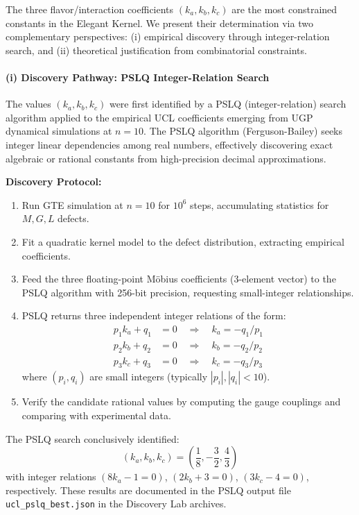 \documentclass[11pt,twocolumn]{article}
\begin{document}
The three flavor/interaction coefficients $(k_a, k_b, k_c)$ are the most constrained constants in the Elegant Kernel. We present their determination via two complementary perspectives: (i) empirical discovery through integer-relation search, and (ii) theoretical justification from combinatorial constraints.

\paragraph{(i) Discovery Pathway: PSLQ Integer-Relation Search}

The values $(k_a, k_b, k_c)$ were first identified by a PSLQ (integer-relation) search algorithm applied to the empirical UCL coefficients emerging from UGP dynamical simulations at $n=10$. The PSLQ algorithm (Ferguson-Bailey) seeks integer linear dependencies among real numbers, effectively discovering exact algebraic or rational constants from high-precision decimal approximations.

\textbf{Discovery Protocol:}
\begin{enumerate}[label=\arabic*., itemsep=0.15em]
\item Run GTE simulation at $n=10$ for $10^6$ steps, accumulating statistics for $M, G, L$ defects.
\item Fit a quadratic kernel model to the defect distribution, extracting empirical coefficients.
\item Feed the three floating-point Möbius coefficients (3-element vector) to the PSLQ algorithm with 256-bit precision, requesting small-integer relationships.
\item PSLQ returns three independent integer relations of the form:
\[
\begin{aligned}
p_1 k_a + q_1 &= 0 \quad \Rightarrow \quad k_a = -q_1/p_1 \\
p_2 k_b + q_2 &= 0 \quad \Rightarrow \quad k_b = -q_2/p_2 \\
p_3 k_c + q_3 &= 0 \quad \Rightarrow \quad k_c = -q_3/p_3
\end{aligned}
\]
where $(p_i, q_i)$ are small integers (typically $|p_i|, |q_i| < 10$).
\item Verify the candidate rational values by computing the gauge couplings and comparing with experimental data.
\end{enumerate}

The PSLQ search conclusively identified:
\[
(k_a, k_b, k_c) = \left(\frac{1}{8}, -\frac{3}{2}, \frac{4}{3}\right)
\]
with integer relations $(8k_a - 1 = 0)$, $(2k_b + 3 = 0)$, $(3k_c - 4 = 0)$, respectively. These results are documented in the PSLQ output file \texttt{ucl\_pslq\_best.json} in the Discovery Lab archives.
\end{document}
